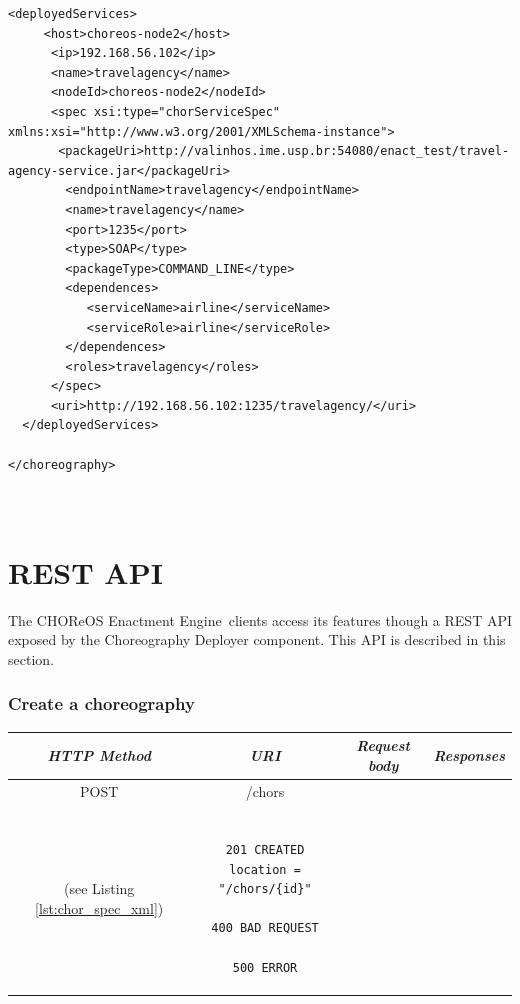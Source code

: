 \documentclass[a4paper, 10pt]{article}
\newcommand{\ee}{CHOReOS Enactment Engine}
\begin{document}
{\begin{lstlisting}[caption=Choreography XML representation example, label=lst:chor_xml]
  <deployedServices>
     <host>choreos-node2</host>
      <ip>192.168.56.102</ip>
      <name>travelagency</name>
      <nodeId>choreos-node2</nodeId>
      <spec xsi:type="chorServiceSpec" xmlns:xsi="http://www.w3.org/2001/XMLSchema-instance">
       <packageUri>http://valinhos.ime.usp.br:54080/enact_test/travel-agency-service.jar</packageUri>
        <endpointName>travelagency</endpointName>
        <name>travelagency</name>
        <port>1235</port>
        <type>SOAP</type>
        <packageType>COMMAND_LINE</type>
        <dependences>
           <serviceName>airline</serviceName>
           <serviceRole>airline</serviceRole>
        </dependences>
        <roles>travelagency</roles>
      </spec>
      <uri>http://192.168.56.102:1235/travelagency/</uri>
  </deployedServices>

</choreography>



\end{lstlisting}

}

\section{REST API}
\label{sec:api}

The \ee\ clients access its features though a REST API exposed by the Choreography Deployer component. This API is described in this section.

\subsubsection*{Create a choreography}

\begin{tabular}{|c|c|c|c|}
\hline 
\itshape{HTTP Method} & \itshape{URI} & \itshape{Request body} & \itshape{Responses} \\ 
\hline 
POST & /chors & 

\begin{minipage}{2in}
\verb!ChorSpec! XML representation \\ 
(see Listing \ref{lst:chor_spec_xml})
\end{minipage} 
&

\begin{minipage}{2in}
\begin{verbatim}

201 CREATED
location = "/chors/{id}"

400 BAD REQUEST

500 ERROR

\end{verbatim}
\end{minipage} 
\\ 
\hline 
\end{tabular} \\
\end{document}

